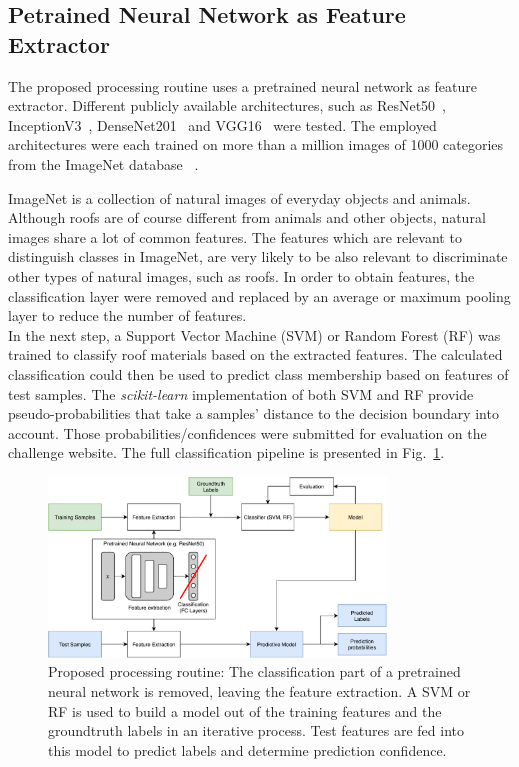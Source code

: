 \documentclass[11pt]{article}
\begin{document}
	
	\subsection{Petrained Neural Network as Feature Extractor}
	The proposed processing routine uses a pretrained neural network as feature extractor. Different publicly available architectures, such as ResNet50~\cite{resnet}, InceptionV3~\cite{inceptionv3}, DenseNet201~\cite{densenet} and VGG16~\cite{vgg} were tested. The employed architectures were each trained on more than a million images of 1000 categories from the ImageNet database ~\cite{imagenet}. 
	
	ImageNet is a collection of natural images of everyday objects and animals. Although roofs are of course different from animals and other objects, natural images share a lot of common features. The features which are relevant to distinguish classes in ImageNet, are very likely to be also relevant to discriminate other types of natural images, such as roofs.
	In order to obtain features, the classification layer were removed and replaced by an average or maximum pooling layer to reduce the number of features.\\	
	
	In the next step, a Support Vector Machine (SVM) or Random Forest (RF) was trained to classify roof materials based on the extracted features. The calculated classification could then be used to predict class membership based on features of test samples. The \textit{scikit-learn} implementation of both SVM and RF provide pseudo-probabilities that take a samples' distance to the decision boundary into account. Those probabilities/confidences were submitted for evaluation on the challenge website.
	The full classification pipeline is presented in Fig.~\ref{fig:flowchart}.	
	
	\begin{figure}
		\centering		
		\includegraphics[width=0.8\textwidth]{figures/flowchart.pdf}
		\caption{Proposed processing routine: The classification part of a pretrained neural network is removed, leaving the feature extraction. A SVM or RF is used to build a model out of the training features and the groundtruth labels in an iterative process. Test features are fed into this model to predict labels and determine prediction confidence.}
		\label{fig:flowchart}
	\end{figure}
\end{document}
